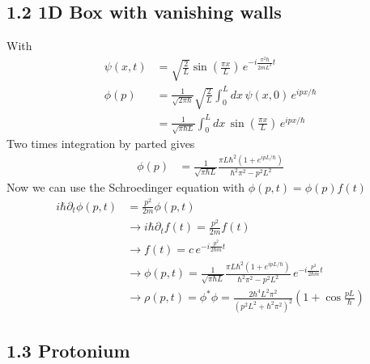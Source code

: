 \documentclass[10pt,a4paper]{book}
\theoremstyle{definition}
\begin{document}
\subsection{1.2 1D Box with vanishing walls}
With
\begin{align}
\psi(x,t)&=\sqrt{\frac{2}{L}}\sin\left(\frac{\pi x}{L}\right)
\,e^{-i\frac{\pi^2\hbar}{2mL^2}t}\\
\phi(p)
&=\frac{1}{\sqrt{2\pi\hbar}}\sqrt{\frac{2}{L}}\int_0^L dx\,\psi(x,0)\,e^{ipx/\hbar}\\
&=\frac{1}{\sqrt{\pi\hbar L}}\int_0^L dx\,\sin\left(\frac{\pi x}{L}\right)\,e^{ipx/\hbar}
\end{align}
Two times integration by parted gives
\begin{align}
\phi(p)
&=\frac{1}{\sqrt{\pi\hbar L}}\frac{\pi L\hbar^2\left(1+e^{ipL/\hbar}\right)}{\hbar^2\pi^2-p^2L^2}
\end{align}
Now we can use the Schroedinger equation with $\phi(p,t)=\phi(p)f(t)$
\begin{align}
i\hbar\partial_t\phi(p,t)&=\frac{p^2}{2m}\phi(p,t)\\
&\rightarrow i\hbar\partial_t f(t)=\frac{p^2}{2m}f(t)\\
&\rightarrow f(t)=c\,e^{-i\frac{p^2}{2\hbar m}t}\\
&\rightarrow \phi(p,t)=\frac{1}{\sqrt{\pi\hbar L}}\frac{\pi L\hbar^2\left(1+e^{ipL/\hbar}\right)}{\hbar^2\pi^2-p^2L^2} \,e^{-i\frac{p^2}{2\hbar m}t}\\
&\rightarrow \rho(p,t)=\phi^*\phi=\frac{2\hbar^4 L^2 \pi^2}{(p^2L^2+\hbar^2\pi^2)^2}\left(1+\cos\frac{pL}{\hbar}\right)
\end{align}

\subsection{1.3 Protonium}
\end{document}

